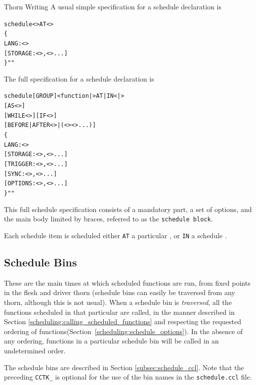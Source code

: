 \begin{cactuspart}{Thorn Writing}
A usual simple specification for a schedule declaration is
\begin{alltt}schedule <> AT <>
\{
  LANG: <>
  [STORAGE:       <>,<>...]
\} ""
\end{alltt}

The full specification for a schedule declaration is
\begin{alltt}schedule [GROUP] <function|> AT|IN <|>
         [AS <>]
         [WHILE <>] [IF <>]
         [BEFORE|AFTER <>|(<> <> ...)]
\{
  LANG: <>
  [STORAGE:       <>,<>...]
  [TRIGGER:       <>,<>...]
  [SYNC:          <>,<>...]
  [OPTIONS:       <>,<>...]
\} ""
\end{alltt}

This full schedule specification consists of a mandatory part, a set
of options, and the main body limited by braces, referred to as the
\texttt{schedule block}.

Each schedule item is scheduled either \texttt{AT} a particular
, or \texttt{IN} a schedule .


\subsection{Schedule Bins}
\label{scheduling:schedule_bins}

These are the main times at which scheduled functions are run, from
fixed points in the flesh and driver thorn (schedule bins can easily
be traversed from any thorn, although this is not usual).  When a
schedule bin is \textit{traversed}, all the functions scheduled in that
particular are called, in the manner described in Section
\ref{scheduling:calling_scheduled_functions} and respecting the
requested ordering of functions(Section~\ref{scheduling:schedule_options}). In the absence of any ordering, functions in a particular schedule bin will be called in
an undetermined order.

The schedule bins are described in Section \ref{subsec:schedule_ccl}. Note that
the preceding \texttt{CCTK\_} is optional for the use of the bin names
in the \texttt{schedule.ccl} file.


\end{cactuspart}
